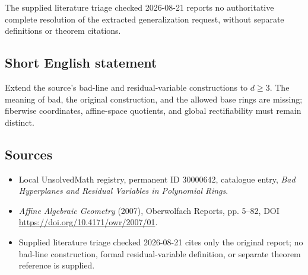 \documentclass[11pt]{article}
\begin{document}
The supplied literature triage checked 2026-08-21 reports no authoritative complete resolution of the extracted generalization request, without separate definitions or theorem citations.
\subsection{Short English statement}
Extend the source's bad-line and residual-variable constructions to \(d\geq3\). The meaning of bad, the original construction, and the allowed base rings are missing; fiberwise coordinates, affine-space quotients, and global rectifiability must remain distinct.
\subsection{Sources}
\begin{itemize}
\item Local UnsolvedMath registry, permanent ID 30000642, catalogue entry, \emph{Bad Hyperplanes and Residual Variables in Polynomial Rings}.
\item \emph{Affine Algebraic Geometry} (2007), Oberwolfach Reports, pp. 5--82, DOI \url{https://doi.org/10.4171/owr/2007/01}.
\item Supplied literature triage checked 2026-08-21 cites only the original report; no bad-line construction, formal residual-variable definition, or separate theorem reference is supplied.
\end{itemize}
\end{document}
